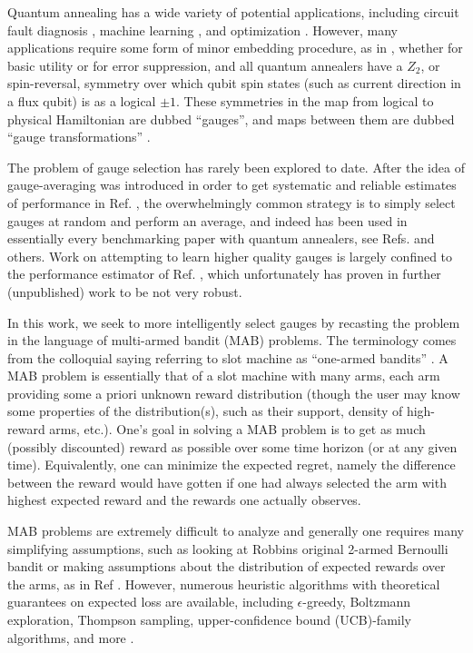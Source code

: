 Quantum annealing has a wide variety of potential applications, including circuit fault diagnosis \cite{cfd_2017}, machine learning \cite{Amin:2016,Benedetti:2016oz,Adachi:2015qe,Biamonte:2016aa,higgs_qa}, and optimization \cite{Farhi:01,q108,speedup,hen:14f}. However, many applications require some form of minor embedding procedure, as in \cite{Adachi:2015qe,higgs_qa,vinci2015nested}, whether for basic utility or for error suppression, and all quantum annealers have a $Z_2$, or spin-reversal, symmetry over which qubit spin states (such as current direction in a flux qubit) is as a logical $\pm 1$. These symmetries in the map from logical to physical Hamiltonian are dubbed ``gauges'', and maps between them are dubbed ``gauge transformations'' \cite{q108}.

The problem of gauge selection has rarely been explored to date. After the idea of gauge-averaging was introduced in order to get systematic and reliable estimates of performance in Ref. \cite{q108}, the overwhelmingly common strategy is to simply select gauges at random and perform an average, and indeed has been used in essentially every benchmarking paper with quantum annealers, see Refs. \cite{q108,higgs_qa,hen:14f,King:2015zr,DW2000Q} and others. Work on attempting to learn higher quality gauges is largely confined to the performance estimator of Ref. \cite{perdomo:15a}, which unfortunately has proven in further (unpublished) work to be not very robust.  

In this work, we seek to more intelligently select gauges by recasting the problem in the language of multi-armed bandit (MAB) problems. The terminology comes from the colloquial saying referring to slot machine as ``one-armed bandits'' \cite{bayesian_bandit}. A MAB problem is essentially that of a slot machine with many arms, each arm providing some a priori unknown reward distribution (though the user may know some properties of the distribution(s), such as their support, density of high-reward arms, etc.). One's goal in solving a MAB problem is to get as much (possibly discounted) reward as possible over some time horizon (or at any given time). Equivalently, one can minimize the expected regret, namely the difference between the reward would have gotten if one had always selected the arm with highest expected reward and the rewards one actually observes.

MAB problems are extremely difficult to analyze and generally one requires many simplifying assumptions, such as looking at Robbins \cite{robbins1952} original 2-armed Bernoulli bandit or making assumptions about the distribution of expected rewards over the arms, as in Ref \cite{infinitebandits}. However, numerous heuristic algorithms with theoretical guarantees on expected loss are available, including $\epsilon$-greedy, Boltzmann exploration, Thompson sampling, upper-confidence bound (UCB)-family algorithms, and more \cite{infinitebandits,banditalgorithms,bayesian_bandit}.

